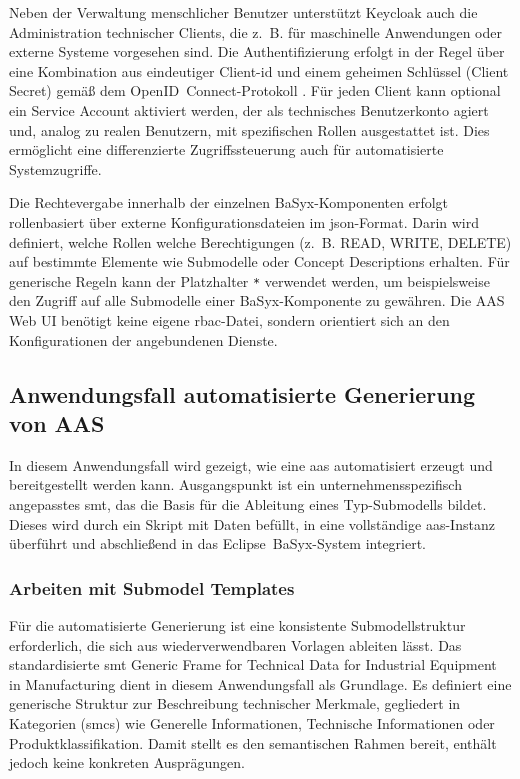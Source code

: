 Neben der Verwaltung menschlicher Benutzer unterstützt Keycloak auch die Administration technischer Clients, die z.~B. für maschinelle Anwendungen oder externe Systeme vorgesehen sind.
Die Authentifizierung erfolgt in der Regel über eine Kombination aus eindeutiger Client-\acs{id} und einem geheimen Schlüssel (Client Secret) gemäß dem \mbox{OpenID Connect}-Protokoll \cite{OpenID}.  
Für jeden Client kann optional ein Service Account aktiviert werden, der als technisches Benutzerkonto agiert und, analog zu realen Benutzern, mit spezifischen Rollen ausgestattet ist.  
Dies ermöglicht eine differenzierte Zugriffssteuerung auch für automatisierte Systemzugriffe.

Die Rechtevergabe innerhalb der einzelnen BaSyx-Komponenten erfolgt rollenbasiert über externe Konfigurationsdateien im \acs{json}-Format.  
Darin wird definiert, welche Rollen welche Berechtigungen (z.~B. READ, WRITE, DELETE) auf bestimmte Elemente wie Submodelle oder Concept Descriptions erhalten.  
Für generische Regeln kann der Platzhalter \texttt{*} verwendet werden, um beispielsweise den Zugriff auf alle Submodelle einer BaSyx-Komponente zu gewähren.  
Die AAS Web UI benötigt keine eigene \acs{rbac}-Datei, sondern orientiert sich an den Konfigurationen der angebundenen Dienste.

\subsection{Anwendungsfall automatisierte Generierung von AAS}
In diesem Anwendungsfall wird gezeigt, wie eine \acs{aas} automatisiert erzeugt und bereitgestellt werden kann.  
Ausgangspunkt ist ein unternehmensspezifisch angepasstes \acs{smt}, das die Basis für die Ableitung eines Typ-Submodells bildet.
Dieses wird durch ein Skript mit Daten befüllt, in eine vollständige \acs{aas}-Instanz überführt und abschließend in das \mbox{Eclipse BaSyx-System} integriert.

\subsubsection{Arbeiten mit Submodel Templates}
\label{chap:ErstellenvonSubmodelTemplates}
Für die automatisierte Generierung ist eine konsistente Submodellstruktur erforderlich, die sich aus wiederverwendbaren Vorlagen ableiten lässt.
Das standardisierte \acs{smt} \mbox{Generic} \mbox{Frame} \mbox{for} \mbox{Technical} \mbox{Data} \mbox{for} \mbox{Industrial} \mbox{Equipment} \mbox{in} \mbox{Manufacturing} \cite{SpezifikaitonTechnischeDaten} dient in diesem Anwendungsfall als Grundlage.
Es definiert eine generische Struktur zur Beschreibung technischer Merkmale, gegliedert in Kategorien (\acsp{smc}) wie Generelle Informationen, Technische Informationen oder \mbox{Produktklassifikation}.
Damit stellt es den semantischen Rahmen bereit, enthält jedoch keine konkreten Ausprägungen.

